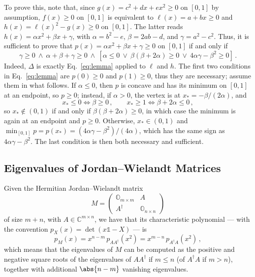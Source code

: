 \begin{subappendices}
To prove this, note that,
since $g(x)=c^2 + dx + ex^2 \ge 0$ on $[0,1]$ by assumption, $f(x) \ge 0$ on $[0,1]$ is equivalent to $\ell(x) = a + bx \ge 0$ and $h(x) = \ell(x)^2 -g(x) \ge 0$ on $[0,1]$. The latter reads $h(x) = \alpha x^2 + \beta x + \gamma$, with $\alpha = b^2-e$, $\beta = 2ab-d$, and $\gamma=a^2-c^2$.
Thus, it is sufficient to prove that $p(x) = \alpha x^2+\beta x + \gamma \ge 0$ on $[0,1]$ if and only if
    \begin{equation}\label{eq:lemma}
        \gamma\ge0 \ \land \ \alpha+\beta+\gamma\ge0 \ \land \
    [\alpha\le0 \ \lor \ \beta(\beta+2\alpha)\ge0 \ \lor \ 4\alpha\gamma-\beta^2\ge0 ] \,.
    \end{equation}
Indeed, $\Delta$ is exactly Eq.~\eqref{eq:lemma} applied to $\ell$ and $h$.
The first two conditions in Eq.~\eqref{eq:lemma} are $p(0)\ge 0$ and $p(1)\ge 0$, thus they are necessary; assume them in what follows. If $\alpha \le 0$, then $p$ is concave and has its minimum on $[0,1]$ at an endpoint, so $p\ge 0$; instead, if $\alpha >0$, the vertex is at $x_\ast = -\beta/(2\alpha)$, and
\begin{equation}
    x_\ast\le0 \iff \beta\ge0 \,, \qquad x_\ast\ge1 \iff \beta+2\alpha\le0 \,,
\end{equation}
so $x_\ast \notin (0,1)$ if and only if $\beta(\beta+2\alpha)\ge 0$, in which case the minimum is again at an endpoint and $p\ge 0$. Otherwise, $x_\ast \in (0,1)$ and $\min_{[0,1]} p = p(x_\ast) = (4\alpha\gamma-\beta^2)/(4\alpha)$, which has the same sign as $4\alpha\gamma-\beta^2$. The last condition is then both necessary and sufficient. 

\subsection{Eigenvalues of Jordan--Wielandt Matrices}

Given the Hermitian Jordan--Wielandt matrix
\begin{equation}
    M=\begin{pmatrix}
        \mathbb{O}_{m\times m} & A \\ A^\dag & \mathbb{O}_{n\times n}
    \end{pmatrix}
\end{equation}
of size $m+n$,
with $A\in \mathbb{C}^{m \times n}$,
we have that its characteristic polynomial --- with the convention $p_X(x) = \det(x\mathbb{1}-X)$ --- is
\begin{equation}
    p_M(x)=x^{n-m}\,p_{AA^\dag}(x^2) = x^{m-n}\,p_{A^\dag A}(x^2) \,,
\end{equation}
which means that the eigenvalues of $M$ can be computed as the positive and negative square roots of the eigenvalues of $AA^\dag$ if $m\le n$ (of $A^\dag A$ if $m > n$), together with additional $\abs{n-m}$ vanishing eigenvalues. 
%


\end{subappendices}

